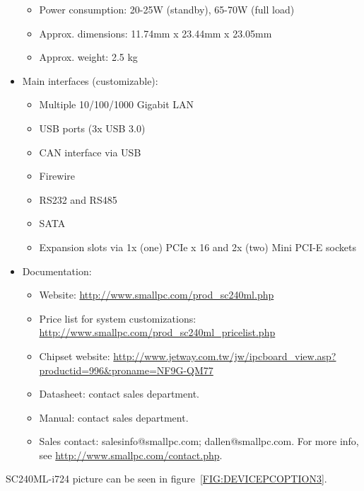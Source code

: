 \begin{itemize}
\begin{itemize}
    \item Power consumption: 20-25W (standby), 65-70W (full load)
    \item Approx. dimensions: 11.74mm x 23.44mm x 23.05mm
    \item Approx. weight: 2.5 kg
  \end{itemize}
  \item Main interfaces (customizable):
  \begin{itemize}
    \item Multiple 10/100/1000 Gigabit LAN
    \item USB ports (3x USB 3.0)
    \item CAN interface via USB
    \item Firewire
    \item RS232 and RS485
    \item SATA
    \item Expansion slots via 1x (one) PCIe x 16 and 2x (two) Mini PCI-E sockets
  \end{itemize}
  \item Documentation:
  \begin{itemize}
    \item Website: \href{http://www.smallpc.com/prod\_sc240ml.php}{http://www.smallpc.com/prod\_sc240ml.php}
    \item Price list for system customizations: \href{http://www.smallpc.com/prod\_sc240ml\_pricelist.php}{http://www.smallpc.com/prod\_sc240ml\_pricelist.php}
    \item Chipset website: \href{http://www.jetway.com.tw/jw/ipcboard\_view.asp?productid=996\&proname=NF9G-QM77}{http://www.jetway.com.tw/jw/ipcboard\_view.asp?productid=996\&proname=NF9G-QM77}
    \item Datasheet: contact sales department.
    \item Manual: contact sales department.
    \item Sales contact: salesinfo@smallpc.com; dallen@smallpc.com. For more info, see \href{http://www.smallpc.com/contact.php}{http://www.smallpc.com/contact.php}.
  \end{itemize}
\end{itemize}
SC240ML-i724 picture can be seen in figure~\ref{FIG:DEVICEPCOPTION3}.
